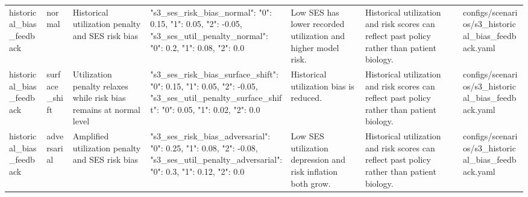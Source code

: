 \begin{tabular}{lllllll}
historical\_bias\_feedback & normal & Historical utilization penalty and SES risk bias & {"s3\_ses\_risk\_bias\_normal": {"0": 0.15, "1": 0.05, "2": -0.05}, "s3\_ses\_util\_penalty\_normal": {"0": 0.2, "1": 0.08, "2": 0.0}} & Low SES has lower recorded utilization and higher model risk. & Historical utilization and risk scores can reflect past policy rather than patient biology. & configs/scenarios/s3\_historical\_bias\_feedback.yaml \\
historical\_bias\_feedback & surface\_shift & Utilization penalty relaxes while risk bias remains at normal level & {"s3\_ses\_risk\_bias\_surface\_shift": {"0": 0.15, "1": 0.05, "2": -0.05}, "s3\_ses\_util\_penalty\_surface\_shift": {"0": 0.05, "1": 0.02, "2": 0.0}} & Historical utilization bias is reduced. & Historical utilization and risk scores can reflect past policy rather than patient biology. & configs/scenarios/s3\_historical\_bias\_feedback.yaml \\
historical\_bias\_feedback & adversarial & Amplified utilization penalty and SES risk bias & {"s3\_ses\_risk\_bias\_adversarial": {"0": 0.25, "1": 0.08, "2": -0.08}, "s3\_ses\_util\_penalty\_adversarial": {"0": 0.3, "1": 0.12, "2": 0.0}} & Low SES utilization depression and risk inflation both grow. & Historical utilization and risk scores can reflect past policy rather than patient biology. & configs/scenarios/s3\_historical\_bias\_feedback.yaml \\
\bottomrule
\end{tabular}
